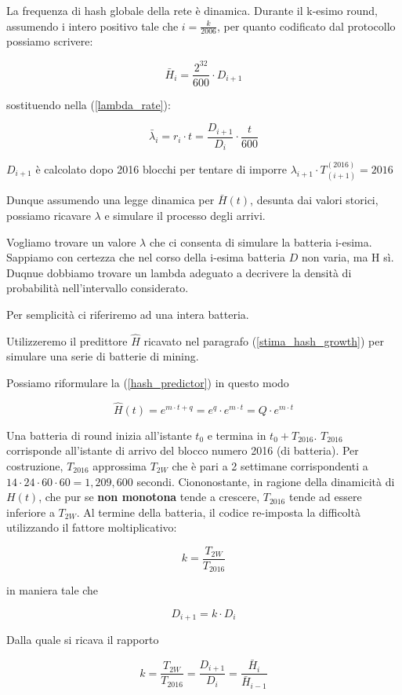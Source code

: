 \documentclass{book}
\theoremstyle{definition}
\begin{document}
La frequenza di hash globale della rete è dinamica.
Durante il k-esimo round, assumendo i intero positivo tale che $i = \frac{k}{2006}$, per quanto codificato dal protocollo possiamo scrivere:

$$
    \bar{H}_{i} = \frac{2^{32}}{600} \cdot D_{i+1}
$$

sostituendo nella (\ref{lambda_rate}):

$$
\bar{\lambda}_{i} = r_{i} \cdot t = \frac{D_{i+1}}{D_{i}} \cdot \frac{t}{600}
$$

$D_{i+1}$ è calcolato dopo 2016 blocchi per tentare di imporre $\lambda_{i+1} \cdot T_{(i+1)}^{(2016)}  = 2016$ 

Dunque assumendo una legge dinamica per $\bar{H}(t)$, desunta dai valori storici, possiamo ricavare $\lambda$ e simulare il processo degli arrivi.

Vogliamo trovare un valore $\lambda$ che ci consenta di simulare la batteria i-esima. Sappiamo con certezza che nel corso della i-esima batteria $D$ non varia, ma H sì. Duqnue dobbiamo trovare un lambda adeguato a decrivere la densità di probabilità nell'intervallo considerato.

Per semplicità ci riferiremo ad una intera batteria.

Utilizzeremo il predittore $\hat{H}$ ricavato nel paragrafo (\ref{stima_hash_growth}) per simulare una serie di batterie di mining.

Possiamo riformulare la (\ref{hash_predictor}) in questo modo

$$
	\hat{H}(t) = e^{m \cdot t + q} = e^{q} \cdot e^{m \cdot t} = Q \cdot e^{m \cdot t}
$$

Una batteria di round inizia all'istante $t_{0}$ e termina in $t_{0} + T_{2016}$. $T_{2016}$ corrisponde all'istante di arrivo del blocco numero 2016 (di batteria). Per costruzione, $T_{2016}$ approssima $T_{2W}$ che è pari a 2 settimane corrispondenti a $14 \cdot 24 \cdot 60 \cdot 60 = 1,209,600$ secondi. 
Ciononostante, in ragione della dinamicità di $H(t)$, che pur se \textbf{non monotona} tende a crescere, $T_{2016}$ tende ad essere inferiore a $T_{2W}$. Al termine della batteria, il codice re-imposta la difficoltà utilizzando il fattore moltiplicativo:

$$
    k = \frac{T_{2W}}{T_{2016}}
$$

in maniera tale che

$$
    D_{i+1} = k \cdot D_{i}
$$

Dalla quale si ricava il rapporto

$$
    k = \frac{T_{2W}}{T_{2016}} = \frac{D_{i+1}}{D_{i}} = \frac{\bar{H}_{i}}{\bar{H}_{i-1}}
$$ 
\end{document}

